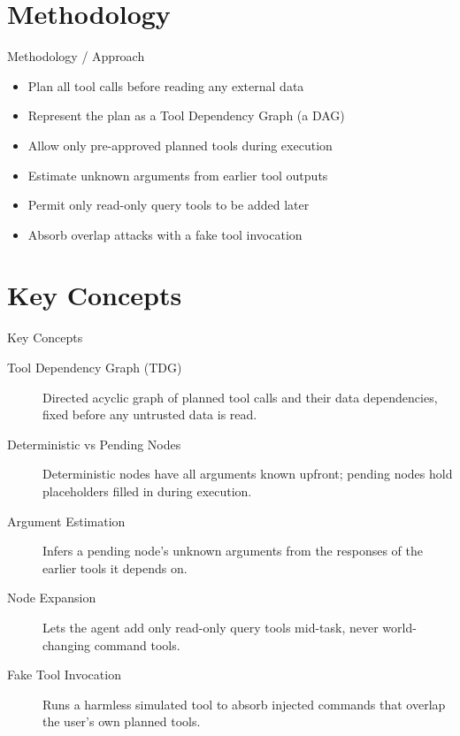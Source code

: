 \documentclass[10pt]{beamer}
\begin{document}
\section{Methodology}
\begin{frame}[allowframebreaks]{Methodology / Approach}
\begin{itemize}
  \item Plan all tool calls before reading any external data
  \item Represent the plan as a Tool Dependency Graph (a DAG)
  \item Allow only pre-approved planned tools during execution
  \item Estimate unknown arguments from earlier tool outputs
  \item Permit only read-only query tools to be added later
  \item Absorb overlap attacks with a fake tool invocation
\end{itemize}
\end{frame}

\section{Key Concepts}
\begin{frame}[allowframebreaks]{Key Concepts}
  \begin{description}
    \item[Tool Dependency Graph (TDG)] Directed acyclic graph of planned tool calls and their data dependencies, fixed before any untrusted data is read.
    \item[Deterministic vs Pending Nodes] Deterministic nodes have all arguments known upfront; pending nodes hold placeholders filled in during execution.
    \item[Argument Estimation] Infers a pending node's unknown arguments from the responses of the earlier tools it depends on.
    \item[Node Expansion] Lets the agent add only read-only query tools mid-task, never world-changing command tools.
    \item[Fake Tool Invocation] Runs a harmless simulated tool to absorb injected commands that overlap the user's own planned tools.
  \end{description}
\end{frame}
\end{document}
